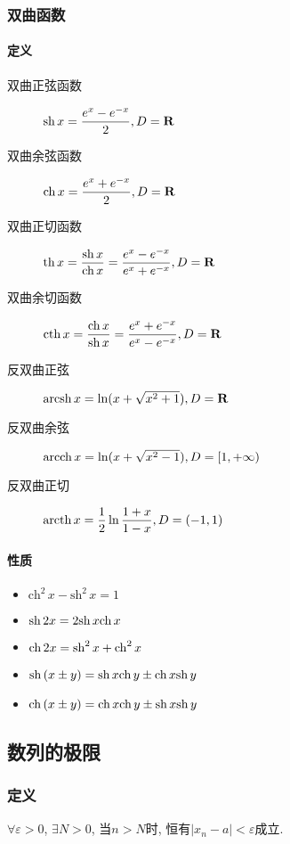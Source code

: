 \subsubsection{双曲函数}
\paragraph{定义}
\begin{description}
\item[双曲正弦函数] \(\displaystyle \mathrm{sh}\,x=\frac{e^x-e^{-x}}{2},D=\mathbf{R}\)
\item[双曲余弦函数] \(\displaystyle \mathrm{ch}\,x=\frac{e^x+e^{-x}}{2},D=\mathbf{R}\)
\item[双曲正切函数] \(\displaystyle \mathrm{th}\,x=\frac{\mathrm{sh}\,x}{\mathrm{ch}\,x}=\frac{e^x-e^{-x}}{e^x+e^{-x}},D=\mathbf{R}\)
\item[双曲余切函数] \(\displaystyle \mathrm{cth}\,x=\frac{\mathrm{ch}\,x}{\mathrm{sh}\,x}=\frac{e^x+e^{-x}}{e^x-e^{-x}},D=\mathbf{R}\)
\item[反双曲正弦] \(\mathrm{arcsh}\,x=\ln (x+\sqrt{x^2+1}),D=\mathbf{R}\)
\item[反双曲余弦] \(\mathrm{arcch}\,x=\ln (x+\sqrt{x^2-1}),D=[1,+\infty)\)
\item[反双曲正切] \(\displaystyle \mathrm{arcth}\,x=\frac{1}{2}\ln \frac{1+x}{1-x},D=(-1,1)\)
\end{description}

\paragraph{性质}
\begin{itemize}
\item \(\mathrm{ch}^2\,x-\mathrm{sh}^2\,x=1\)
\item \(\mathrm{sh}\,2x=2\mathrm{sh}\,x\mathrm{ch}\,x\)
\item \(\mathrm{ch}\,2x=\mathrm{sh}^2\,x+\mathrm{ch}^2\,x\)
\item \(\mathrm{sh}\,(x\pm y)=\mathrm{sh}\,x\mathrm{ch}\,y\pm \mathrm{ch}\,x\mathrm{sh}\,y\)
\item \(\mathrm{ch}\,(x\pm y)=\mathrm{ch}\,x\mathrm{ch}\,y\pm \mathrm{sh}\,x\mathrm{sh}\,y\)
\end{itemize}

\subsection{数列的极限}
\subsubsection{定义}
\(\forall\varepsilon>0\), \(\exists N>0\), 当\(n>N\)时, 恒有\(|x_n-a|<\varepsilon\)成立.

